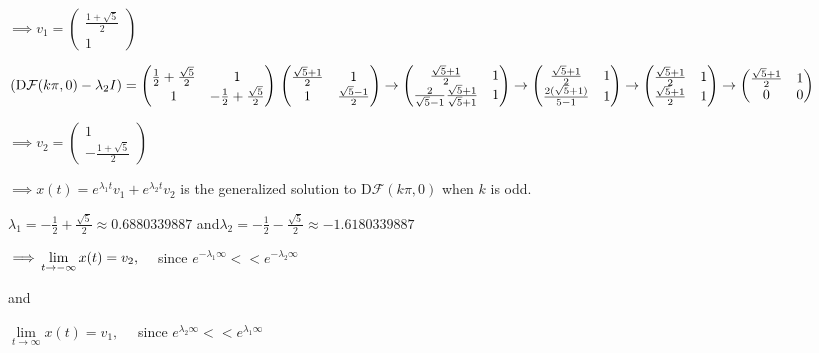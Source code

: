 \documentclass{article}
\begin{document}
$
\implies v_1 =  \begin{pmatrix}\frac{1+\sqrt{5}}{2}\\1\end{pmatrix}
$


$(\text{D}\mathcal{F}(k\pi,0) -\lambda_2 I)= \begin{pmatrix} \frac{1}{2} +\frac{\sqrt{5}}{2} &
  1 \\ 1 & -\frac{1}{2} +\frac{\sqrt{5}}{2}\end{pmatrix}\\
 \begin{pmatrix} \frac{\sqrt{5}+1}{2} &
  1 \\ 1 & \frac{\sqrt{5} -1}{2}\end{pmatrix}
\rightarrow
\begin{pmatrix} \frac{\sqrt{5}+1}{2} &
  1 \\ \frac{2}{\sqrt{5} -1}\frac{\sqrt{5}+1}{\sqrt{5}+1} & 1\end{pmatrix}
\rightarrow
\begin{pmatrix} \frac{\sqrt{5}+1}{2} &
  1 \\ \frac{2(\sqrt{5}+1)}{5-1} & 1\end{pmatrix}
\rightarrow
\begin{pmatrix} \frac{\sqrt{5}+1}{2} &
  1 \\ \frac{\sqrt{5}+1}{2} & 1\end{pmatrix}
\rightarrow
\begin{pmatrix} \frac{\sqrt{5}+1}{2} &
  1 \\ 0 & 0\end{pmatrix}

$

$
\implies v_2 =  \begin{pmatrix}1 \\ -\frac{1+\sqrt{5}}{2}\end{pmatrix}
$

$\implies x(t)= e^{\lambda_1 t}v_1+e^{\lambda_2 t}v_2$ is the generalized
solution to $\text{D}\mathcal{F}(k\pi,0)$ when $k$ is odd.

$\lambda_1 = -\frac{1}{2} +\frac{\sqrt{5}}{2} \approx 0.6880339887 $ and$\lambda_2 =
-\frac{1}{2} -\frac{\sqrt{5}}{2} \approx -1.6180339887$

$\implies \\
\lim\limits_{t\rightarrow -\infty} x(t) = v_2,\quad$ since
$e^{-\lambda_1\infty} << e^{-\lambda_2\infty}$

and

$\lim\limits_{t\rightarrow \infty} x(t) = v_1,\quad$ since
$e^{\lambda_2\infty} << e^{\lambda_1\infty}$
\end{document}
